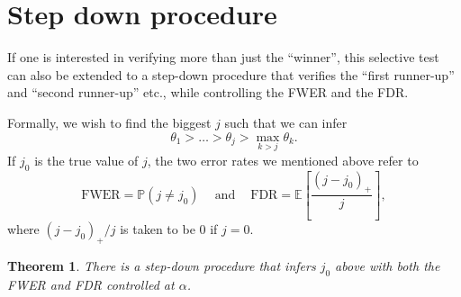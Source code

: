 \documentclass[11pt]{article}
\newtheorem{theorem}{Theorem}
\newcommand{\EE}{\mathbb{E}}
\newcommand{\PP}{\mathbb{P}}
\begin{document}
\section{Step down procedure}
\label{sec:step_down_procedure}

If one is interested in verifying more than just the ``winner'', this selective test can also be extended to a step-down procedure that verifies the ``first runner-up'' and ``second runner-up'' etc., while controlling the FWER and the FDR.

Formally, we wish to find the biggest $j$ such that we can infer
$$\theta_1 > \ldots > \theta_j > \max_{k>j} \theta_k.$$
If $j_0$ is the true value of $j$, the two error rates we mentioned above refer to
$$\text{FWER} = \PP\left(j \ne j_0\right) ~~~~ \text{ and } ~~~~ \text{FDR} = \EE\left[\frac{\left(j - j_0\right)_+}{j}\right],$$
where $\left(j - j_0\right)_+ / j$ is taken to be $0$ if $j = 0$.

\begin{theorem}
There is a step-down procedure that infers $j_0$ above with both the FWER and FDR controlled at $\alpha$.
\end{theorem}
\end{document}
